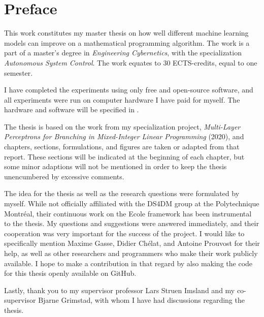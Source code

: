 \chapter*{Preface}
%
This work constitutes my master thesis on how well different machine learning models can improve on a mathematical programming algorithm. The work is a part of a master's degree in \textit{Engineering Cybernetics}, with the specialization\textit{ Autonomous System Control}.
The work equates to 30 ECTS-credits, equal to one semester. 

I have completed the experiments using only free and open-source software, and all experiments were run on computer hardware I have paid for myself. The hardware and software will be specified in .

The thesis is based on the work from my specialization project, \textit{Multi-Layer Perceptrons for Branching in
Mixed-Integer Linear Programming
} (2020), and chapters, sections, formulations, and figures are taken or adapted from that report. These sections will be indicated at the beginning of each chapter, but some minor adaptions will not be mentioned in order to keep the thesis unencumbered by excessive comments.

The idea for the thesis as well as the research questions were formulated by myself.
While not officially affiliated with the \gls{DS4DM} group at the Polytechnique Montr\'{e}al, their continuous work on the \gls{Ecole} framework has been instrumental to the thesis. My questions and suggestions were answered immediately, and their cooperation was very important for the success of the project. I would like to specifically mention Maxime Gasse, Didier Ch\'{e}lat, and Antoine Prouvost for their help, as well as other researchers and programmers who make their work publicly available. I hope to make a contribution in that regard by also making the code for this thesis openly available on GitHub.

Lastly, thank you to my supervisor professor Lars Struen Imsland and my co-supervisor Bjarne Grimstad, with whom I have had discussions regarding the thesis. 


%
\clearpage
